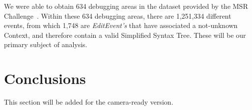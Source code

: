\documentclass[sigconf]{acmart}
\begin{document}
We were able to obtain 634 debugging areas in the dataset 
provided by the MSR Challenge~\cite{msr18challenge}.
Within these 634 debugging areas, there are 1,251,334
different events, from which 1,748 are \textit{EditEvent's}
that have associated a not-unknown Context, and therefore 
contain a valid Simplified Syntax Tree. These will be 
our primary subject of analysis.


\section{Conclusions}

\begin{acks}
 This section will be added for the camera-ready version.

\end{acks}




\end{document}

